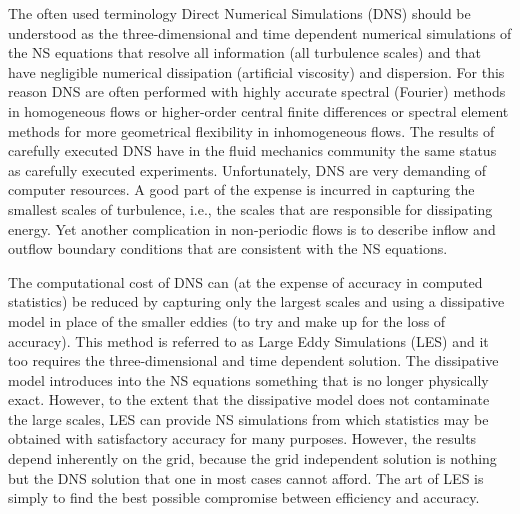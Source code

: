 

The often used terminology Direct Numerical Simulations (DNS) should be understood as the three-dimensional and time dependent numerical simulations of the NS equations that resolve all information (all turbulence scales) and that have negligible numerical dissipation (artificial viscosity) and dispersion. For this reason DNS are often performed with highly accurate spectral (Fourier) methods \cite{CanutoHussainiQuarteroniEtAl1988} in homogeneous flows or higher-order central finite differences or spectral element methods \cite{Semtex} for more geometrical flexibility in inhomogeneous flows. The results of carefully executed DNS have in the fluid mechanics community the same status as carefully executed experiments. Unfortunately, DNS are very demanding of computer resources. A good part of the expense is incurred in capturing the smallest scales of turbulence, i.e., the scales that are responsible for dissipating energy. Yet another complication in non-periodic flows is to describe inflow and outflow boundary conditions that are consistent with the NS equations.

The computational cost of DNS can (at the expense of accuracy in computed statistics) be reduced by capturing only the largest scales and using a dissipative model in place of the smaller eddies (to try and make up for the loss of accuracy). This method is referred to as Large Eddy Simulations (LES) and it too requires the three-dimensional and time dependent solution. The dissipative model introduces into the NS equations something that is no longer physically exact. However, to the extent that the dissipative model does not contaminate the large scales, LES can provide NS simulations from which statistics may be obtained with satisfactory accuracy for many purposes. However, the results depend inherently on the grid, because the grid independent solution is nothing but the DNS solution that one in most cases cannot afford. The art of LES is simply to find the best possible compromise between efficiency and accuracy.

